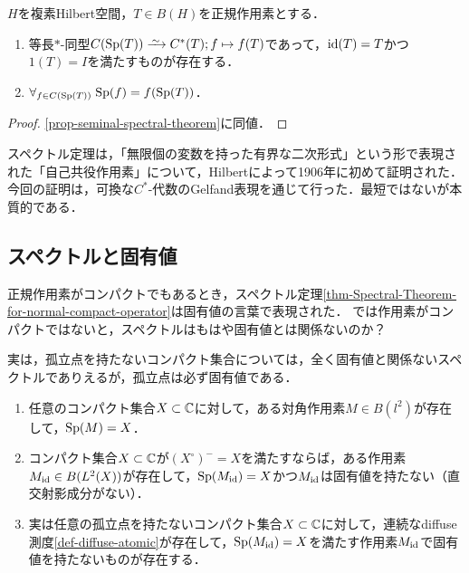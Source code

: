 \documentclass[uplatex,dvipdfmx]{jsreport}
\begin{document}
\begin{theorem}
    $H$を複素Hilbert空間，$T\in B(H)$を正規作用素とする．
    \begin{enumerate}
        \item 等長$*$-同型$C(\Sp(T))\iso C^*(T);f\mapsto f(T)$であって，$\mathrm{id}(T)=T$かつ$1(T)=I$を満たすものが存在する．
        \item $\forall_{f\in C(\mathrm{Sp}(T))}\;\mathrm{Sp}(f)=f(\mathrm{Sp}(T))$．
    \end{enumerate}
\end{theorem}
\begin{proof}
    \ref{prop-seminal-spectral-theorem}に同値．
\end{proof}

\begin{history}
    スペクトル定理は，「無限個の変数を持った有界な二次形式」という形で表現された「自己共役作用素」について，Hilbertによって1906年に初めて証明された．
    今回の証明は，可換な$C^*$-代数のGelfand表現を通じて行った．最短ではないが本質的である．
\end{history}

\subsection{スペクトルと固有値}

\begin{tcolorbox}[colframe=ForestGreen, colback=ForestGreen!10!white,breakable,colbacktitle=ForestGreen!40!white,coltitle=black,fonttitle=\bfseries\sffamily,
title=]
    正規作用素がコンパクトでもあるとき，スペクトル定理\ref{thm-Spectral-Theorem-for-normal-compact-operator}は固有値の言葉で表現された．
    では作用素がコンパクトではないと，スペクトルはもはや固有値とは関係ないのか？

    実は，孤立点を持たないコンパクト集合については，全く固有値と関係ないスペクトルでありえるが，孤立点は必ず固有値である．
\end{tcolorbox}

\begin{lemma}\mbox{}
    \begin{enumerate}
        \item 任意のコンパクト集合$X\subset\mathbb{C}$に対して，ある対角作用素$M\in B(l^2)$が存在して，$\mathrm{Sp}(M)=X$．
        \item コンパクト集合$X\subset\mathbb{C}$が$(X^\circ)^-=X$を満たすならば，ある作用素$M_{\mathrm{id}}\in B(L^2(X))$が存在して，$\mathrm{Sp}(M_{\mathrm{id}})=X$かつ$M_{\mathrm{id}}$は固有値を持たない（直交射影成分がない）．
        \item 実は任意の孤立点を持たないコンパクト集合$X\subset\mathbb{C}$に対して，連続なdiffuse測度\ref{def-diffuse-atomic}が存在して，$\mathrm{Sp}(M_{\mathrm{id}})=X$を満たす作用素$M_{\mathrm{id}}$で固有値を持たないものが存在する．
    \end{enumerate}
\end{lemma}
\end{document}
